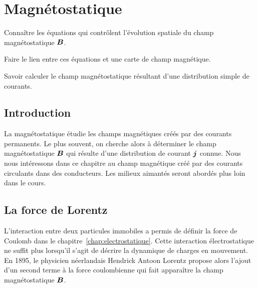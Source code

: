 \chapter{Magnétostatique}
\label{chap:magnetostatique}
\begin{objectif}
	\item Connaître les équations qui contrôlent l'évolution spatiale 
	  du champ magnétostatique $\vecb$.
	\item Faire le lien entre ces équations et une carte de champ 
	  magnétique.
	\item Savoir calculer le champ magnétostatique résultant d'une 
	  distribution simple de courants.
\end{objectif}
\newpage
\section*{Introduction}
La magnétostatique étudie les champs magnétiques créés par des courants permanents.
Le plus souvent, on cherche alors à déterminer le champ magnétostatique $\vecb$
qui résulte d'une distribution de courant $\vecj$ connue. Nous nous intéressons
dans ce chapitre au champ magnétique créé par des courants circulants 
dans des conducteurs. Les milieux aimantés seront abordés plus loin dans le cours.

\section{La force de Lorentz}%
L'interaction entre deux particules immobiles a permis de définir la force de 
Coulomb dans le chapitre~\ref{chap:electrostatique}. Cette interaction 
électrostatique ne suffit plus lorsqu'il s'agit de décrire la dynamique de 
charges en mouvement. En 1895, le physicien néerlandais Hendrick Antoon Lorentz
propose alors l'ajout d'un second terme à la force coulombienne qui fait apparaître
la champ magnétostatique $\vecb$. 

